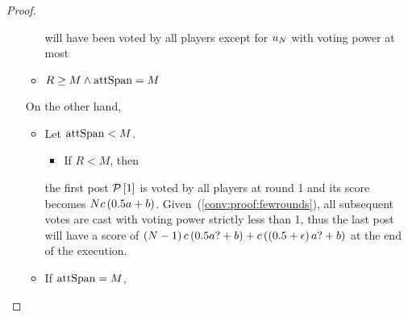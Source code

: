 \begin{proof}
\begin{itemize}
\begin{itemize}
      will have
      been voted by all players except for $u_{N}$ with voting power at
      most

      \item $R \geq M \wedge \mathrm{attSpan} = M$ \\
    \end{itemize}

    On the other hand,
    \begin{itemize}
      \item Let $\mathrm{attSpan} < M$.
      \begin{itemize}
        \item If $R < M$, then
      \end{itemize}
      the first post $\mathcal{P}\left[1\right]$ is voted
      by all players at round 1 and its score becomes $N c \left(0.5a +
      b\right)$. Given~(\ref{conv:proof:fewrounds}), all subsequent votes are
      cast with voting power strictly less than 1, thus the last post will have
      a score of $\left(N - 1\right) c \left(0.5a? + b\right) + c
      \left(\left(0.5 + \epsilon\right)a? + b\right)$ at the end of the
      execution.
      \item If $\mathrm{attSpan} = M$,
    \end{itemize}
  \end{itemize}
\end{proof}
